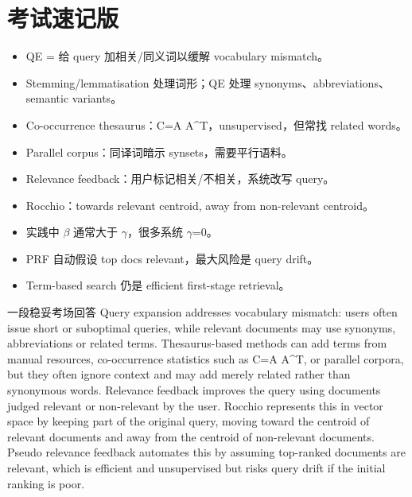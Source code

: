 \documentclass[11pt,a4paper]{ctexart}
\begin{document}
\section{考试速记版}
\begin{itemize}
\item QE = 给 query 加相关/同义词以缓解 vocabulary mismatch。
\item Stemming/lemmatisation 处理词形；QE 处理 synonyms、abbreviations、semantic variants。
\item Co-occurrence thesaurus：C=A A\textasciicircum{}T，unsupervised，但常找 related words。
\item Parallel corpus：同译词暗示 synsets，需要平行语料。
\item Relevance feedback：用户标记相关/不相关，系统改写 query。
\item Rocchio：towards relevant centroid, away from non-relevant centroid。
\item 实践中 \(\beta\) 通常大于 \(\gamma\)，很多系统 \(\gamma\)=0。
\item PRF 自动假设 top docs relevant，最大风险是 query drift。
\item Term-based search 仍是 efficient first-stage retrieval。
\end{itemize}
\begin{callout}{一段稳妥考场回答}
Query expansion addresses vocabulary mismatch: users often issue short or suboptimal queries, while relevant documents may use synonyms, abbreviations or related terms. Thesaurus-based methods can add terms from manual resources, co-occurrence statistics such as C=A A\textasciicircum{}T, or parallel corpora, but they often ignore context and may add merely related rather than synonymous words. Relevance feedback improves the query using documents judged relevant or non-relevant by the user. Rocchio represents this in vector space by keeping part of the original query, moving toward the centroid of relevant documents and away from the centroid of non-relevant documents. Pseudo relevance feedback automates this by assuming top-ranked documents are relevant, which is efficient and unsupervised but risks query drift if the initial ranking is poor.
\end{callout}
\end{document}
